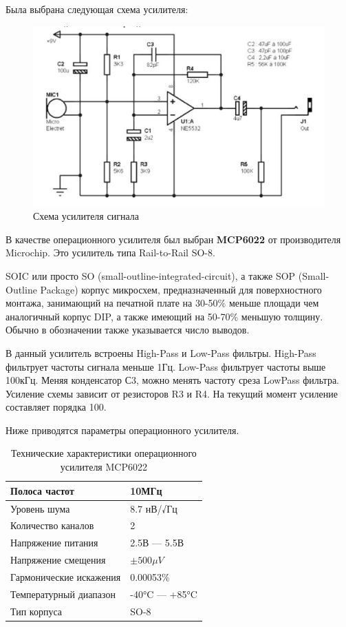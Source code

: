 Была выбрана следующая схема усилителя:

\begin{figure}[H]
\centering
\includegraphics[width=14cm]{circuit.jpg}
\caption{Схема усилителя сигнала}
\end{figure}

В качестве операционного усилителя был выбран \textbf{MCP6022} от производителя Microchip. Это усилитель типа Rail-to-Rail SO-8.

SOIC или просто SO (small-outline-integrated-circuit), а также SOP (Small-Outline Package) корпус микросхем, предназначенный для поверхностного монтажа, занимающий на печатной плате на 30-50\% меньше площади чем аналогичный корпус DIP, а также имеющий на 50-70\% меньшую толщину. Обычно в обозначении также указывается число выводов.

В данный усилитель встроены High-Pass и Low-Pass фильтры. High-Pass фильтрует частоты сигнала меньше 1Гц. Low-Pass фильтрует частоты выше 100кГц. Меняя конденсатор С3, можно менять частоту среза LowPass фильтра. Усиление схемы зависит от резисторов R3 и R4. На текущий момент усиление составляет порядка 100.

Ниже приводятся параметры операционного усилителя.

\begin{table}[h]
\centering
\label{my-label}
\begin{tabular}{|l|l|}
\hline
Полоса частот                  & 10МГц                      \\ \hline
Уровень шума    			   & 8.7 нВ/√Гц                 \\ \hline
Количество каналов             & 2                          \\ \hline
Напряжение питания             & 2.5В --- 5.5В              \\ \hline
Напряжение смещения            & $\pm500\mu V $             \\ \hline
Гармонические искажения        & 0.00053\%                  \\ \hline
Температурный диапазон         & -40°C --- +85°C            \\ \hline
Тип корпуса                    & SO-8                       \\ \hline
\end{tabular}
\caption{Технические характеристики операционного усилителя MCP6022}
\end{table}

